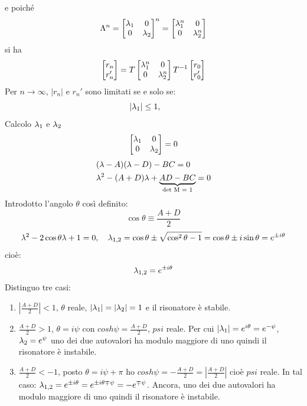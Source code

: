 e poiché
\begin{equation*}
\Lambda^n = \begin{bmatrix}
\lambda_1	&	0\\
0	&	\lambda_2
\end{bmatrix}^n = \begin{bmatrix}
\lambda_1^n	&	0\\
0	&	\lambda_2^n
\end{bmatrix}
\end{equation*}
si ha
\begin{equation*}
\begin{bmatrix}
r_n\\
r_n'
\end{bmatrix} =
T\begin{bmatrix}
\lambda_1^n	&	0\\
0	&	\lambda_2^n
\end{bmatrix}
T^{-1}\begin{bmatrix}
r_0\\
r_0'
\end{bmatrix}
\end{equation*}
Per $n\rightarrow\infty$, $|r_n|$ e $r_n'$ sono limitati se e solo se:
\begin{equation*}
|\lambda_1| \leq 1, \qquad 
\end{equation*}
Calcolo $\lambda_1$ e $\lambda_2$
\begin{equation*}
\begin{bmatrix}
\lambda_1	&	0\\
0	&	\lambda_2
\end{bmatrix} = 0
\end{equation*}
\begin{align*}
&(\lambda-A)(\lambda-D)-BC = 0\\
&\lambda^2-(A+D)\lambda+\underbrace{AD-BC}_\text{det M = 1} = 0
\end{align*}
Introdotto l'angolo $\theta$ così definito:
\begin{equation*}
\cos \theta \equiv \frac{A+D}{2}
\end{equation*}
\begin{equation*}
\lambda^2 - 2\cos\theta\lambda + 1 = 0, \quad \lambda_{1,2} = \cos\theta \pm \sqrt{\cos^2\theta -1} = \cos\theta \pm i\sin\theta = e^{\pm i\theta}
\end{equation*}
cioè:
\begin{equation*}
\lambda_{1,2} = e^{\pm i\theta}
\end{equation*}
Distinguo tre casi:
\begin{enumerate}
\item $\left|\frac{A+D}{2}\right|<1$, $\theta$ reale, $|\lambda_1|=|\lambda_2|=1$ e il risonatore è stabile.
\item $\frac{A+D}{2}>1$, $\theta = i\psi$ con $cosh \psi=\frac{A+D}{2}$, $psi$ reale. Per cui $|\lambda_1|= e^{i\theta}=e^{-\psi}$, $\lambda_2=e^\psi$ uno dei due autovalori ha modulo maggiore di uno quindi il risonatore è instabile.
\item $\frac{A+D}{2}<-1$, posto $\theta=i\psi+\pi$ ho $cosh \psi=-\frac{A+D}{2} = \left|\frac{A+D}{2}\right|$ cioè $psi$ reale. In tal caso: $\lambda_{1,2}= e^{\pm i\theta}=e^{\pm i\theta \mp \psi} = -e^{\mp\psi}$. Ancora, uno dei due autovalori ha modulo maggiore di uno quindi il risonatore è instabile.
\end{enumerate}

